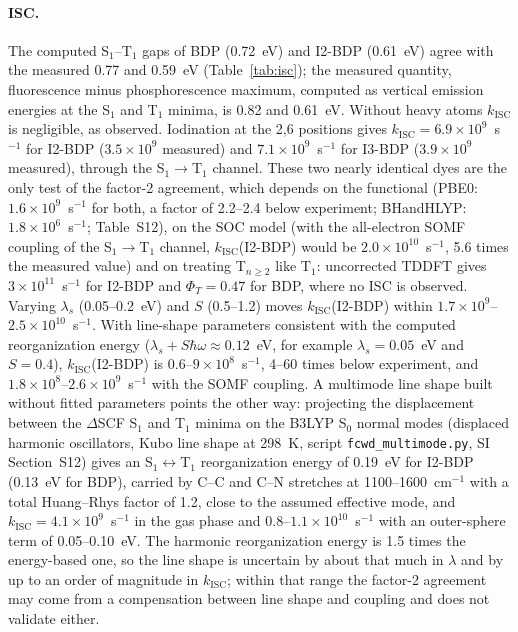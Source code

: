 \documentclass[journal=jctcce,manuscript=article]{achemso}
\newcommand{\kisc}{k_\mathrm{ISC}}
\begin{document}
\paragraph{ISC.} The computed S$_1$--T$_1$ gaps of BDP (0.72~eV) and I2-BDP (0.61~eV) agree with the
measured 0.77 and 0.59~eV (Table~\ref{tab:isc}); the measured quantity, fluorescence minus phosphorescence
maximum, computed as vertical emission energies at the S$_1$ and T$_1$ minima, is 0.82 and 0.61~eV. Without heavy atoms $\kisc$ is negligible, as observed.
Iodination at the 2,6 positions gives $\kisc=6.9\times10^{9}$~s$^{-1}$ for I2-BDP ($3.5\times10^{9}$
measured) and $7.1\times10^{9}$~s$^{-1}$ for I3-BDP ($3.9\times10^{9}$ measured), through the
S$_1\to$T$_1$ channel. These two nearly identical dyes are the only test of the factor-2
agreement, which depends on the functional (PBE0: $1.6\times10^{9}$~s$^{-1}$ for both, a factor of 2.2--2.4 below
experiment; BHandHLYP: $1.8\times10^{6}$~s$^{-1}$; Table~S12), on the SOC model (with the all-electron SOMF coupling of the S$_1\to$T$_1$ channel,
$\kisc$(I2-BDP) would be $2.0\times10^{10}$~s$^{-1}$, 5.6 times the measured value) and on treating T$_{n\ge2}$ like T$_1$: uncorrected TDDFT gives
$3\times10^{11}$~s$^{-1}$ for I2-BDP and $\Phi_T=0.47$ for BDP, where no ISC is observed. Varying $\lambda_s$
(0.05--0.2~eV) and $S$ (0.5--1.2) moves $\kisc$(I2-BDP) within $1.7\times10^{9}$--$2.5\times10^{10}$~s$^{-1}$. With
line-shape parameters consistent with the computed reorganization energy ($\lambda_s+S\hbar\omega\approx0.12$~eV,
for example $\lambda_s=0.05$~eV and $S=0.4$), $\kisc$(I2-BDP) is $0.6$--$9\times10^{8}$~s$^{-1}$, 4--60 times below
experiment, and $1.8\times10^{8}$--$2.6\times10^{9}$~s$^{-1}$ with the SOMF coupling. A multimode line shape
built without fitted parameters points the other way: projecting the displacement between the $\Delta$SCF S$_1$
and T$_1$ minima on the B3LYP S$_0$ normal modes (displaced harmonic oscillators, Kubo line shape at 298~K, script
\texttt{fcwd\_multimode.py}, SI Section~S12) gives an S$_1\leftrightarrow$T$_1$ reorganization energy of 0.19~eV
for I2-BDP (0.13~eV for BDP), carried by C--C and C--N stretches at 1100--1600~cm$^{-1}$ with a total Huang--Rhys
factor of 1.2, close to the assumed effective mode, and $\kisc=4.1\times10^{9}$~s$^{-1}$ in the gas phase and
$0.8$--$1.1\times10^{10}$~s$^{-1}$ with an outer-sphere term of 0.05--0.10~eV. The harmonic reorganization energy is
1.5 times the energy-based one, so the line shape is uncertain by about that much in $\lambda$ and by up to an
order of magnitude in $\kisc$; within that range the factor-2 agreement may come from a compensation between line
shape and coupling and does not validate either.
\end{document}
